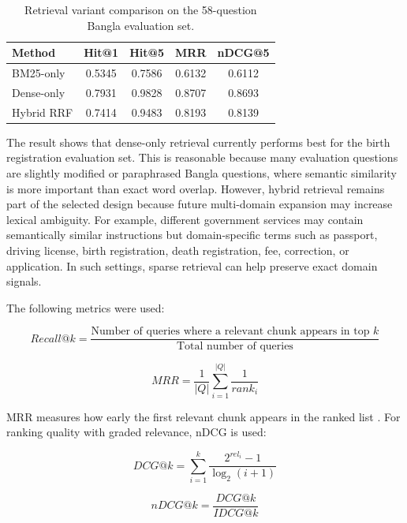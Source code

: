\documentclass[12pt,oneside,openany]{report}
\begin{document}
\begin{table}[h]
\centering
\caption{Retrieval variant comparison on the 58-question Bangla evaluation set.}
\label{tab:retrieval_comparison_updated}
\begin{tabular}{|l|c|c|c|c|}
\hline
\textbf{Method} & \textbf{Hit@1} & \textbf{Hit@5} & \textbf{MRR} & \textbf{nDCG@5} \\
\hline
BM25-only & 0.5345 & 0.7586 & 0.6132 & 0.6112 \\
\hline
Dense-only & 0.7931 & 0.9828 & 0.8707 & 0.8693 \\
\hline
Hybrid RRF & 0.7414 & 0.9483 & 0.8193 & 0.8139 \\
\hline
\end{tabular}
\end{table}

The result shows that dense-only retrieval currently performs best for the birth registration evaluation set. This is reasonable because many evaluation questions are slightly modified or paraphrased Bangla questions, where semantic similarity is more important than exact word overlap. However, hybrid retrieval remains part of the selected design because future multi-domain expansion may increase lexical ambiguity. For example, different government services may contain semantically similar instructions but domain-specific terms such as passport, driving license, birth registration, death registration, fee, correction, or application. In such settings, sparse retrieval can help preserve exact domain signals.

The following metrics were used:

\begin{equation}
Recall@k = \frac{\text{Number of queries where a relevant chunk appears in top }k}{\text{Total number of queries}}
\end{equation}

\begin{equation}
MRR = \frac{1}{|Q|}\sum_{i=1}^{|Q|}\frac{1}{rank_i}
\end{equation}

MRR measures how early the first relevant chunk appears in the ranked list \cite{voorhees1999trec8qa,manning2008ir}. For ranking quality with graded relevance, nDCG is used:

\begin{equation}
DCG@k = \sum_{i=1}^{k}\frac{2^{rel_i}-1}{\log_2(i+1)}
\end{equation}

\begin{equation}
nDCG@k = \frac{DCG@k}{IDCG@k}
\end{equation}
\end{document}
